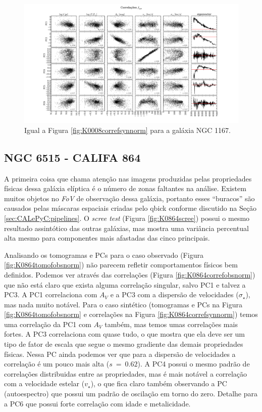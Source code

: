 \begin{figure}
    \includegraphics[width=1.3\textwidth, angle=-90]{figuras/K0119-correl-f_syn_norm-PCvsPhys.pdf}
	\caption[Correlações PCs vs. par\^ametros f\'isicos - $f_{syn}$ - NGC 1167.]
	{Igual a Figura \ref{fig:K0008correfsynnorm} para a galáxia NGC 1167.}
    \label{fig:K0119correfsynnorm}
\end{figure}

\subsection{NGC 6515 - CALIFA 864}

A primeira coisa que chama atenção nas imagens produzidas pelas propriedades físicas dessa galáxia elíptica é o número
de zonas faltantes na análise. Existem muitos objetos no {\em FoV} de observação dessa galáxia, portanto esses
``buracos'' são causados pelas máscaras espaciais criadas pelo {\sc qbick} conforme discutido na Seção
\ref{sec:CALePyC:pipelines}. O {\em scree test} (Figura \ref{fig:K0864scree}) possui o mesmo resultado assintótico das
outras galáxias, mas mostra uma variância percentual alta mesmo para componentes mais afastadas das cinco principais.

Analisando os tomogramas e PCs para o caso observado (Figura \ref{fig:K0864tomofobsnorm}) não parecem refletir
comportamentos físicos bem definidos. Podemos ver através das correlações (Figura \ref{fig:K0864correfobsnorm}) que não
está claro que exista alguma correlação singular, salvo PC1 e talvez a PC3. A PC1 correlaciona com $A_V$ e a PC3 com a
dispersão de velocidades ($\sigma_\star$), mas nada muito notável. Para o caso sintético (tomogramas e PCs na Figura
\ref{fig:K0864tomofobsnorm} e correlações na Figura \ref{fig:K0864correfsynnorm}) temos uma correlação da PC1 com $A_V$
também, mas temos umas correlações mais fortes. A PC3 correlaciona com quase tudo, o que mostra que ela deve ser um tipo
de fator de escala que segue o mesmo gradiente das demais propriedades físicas. Nessa PC ainda podemos ver que para a
dispersão de velocidades a correlação é um pouco mais alta ($s\ =\ 0.62$). A PC4 possui o mesmo padrão de correlações
distribuidas entre as propriedades, mas é mais notável a correlação com a velocidade estelar ($v_\star$), o que fica
claro também observando a PC (autoespectro) que possui um padrão de oscilação em torno do zero. Detalhe para a PC6 que
possui forte correlação com idade e metalicidade.

